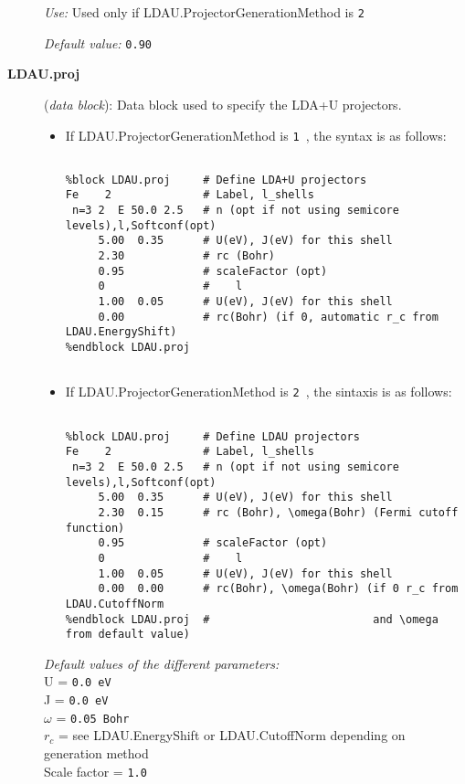 \begin{description}
\textit{Use:} Used only if LDAU.ProjectorGenerationMethod is \texttt{2 }

\textit{Default value:} \texttt{0.90 }

\item[\textbf{LDAU.proj}] (\textit{data block}):
Data block used to specify the LDA+U projectors.

\begin{itemize}
\item If LDAU.ProjectorGenerationMethod is \texttt{1 }, the
syntax is as follows:
\begin{verbatim}

%block LDAU.proj     # Define LDA+U projectors
Fe    2              # Label, l_shells
 n=3 2  E 50.0 2.5   # n (opt if not using semicore levels),l,Softconf(opt)
     5.00  0.35      # U(eV), J(eV) for this shell
     2.30            # rc (Bohr)
     0.95            # scaleFactor (opt)
     0               #    l
     1.00  0.05      # U(eV), J(eV) for this shell
     0.00            # rc(Bohr) (if 0, automatic r_c from LDAU.EnergyShift)
%endblock LDAU.proj


\end{verbatim}

\item If LDAU.ProjectorGenerationMethod is \texttt{2 }, the
sintaxis is as follows:
\begin{verbatim}

%block LDAU.proj     # Define LDAU projectors
Fe    2              # Label, l_shells
 n=3 2  E 50.0 2.5   # n (opt if not using semicore levels),l,Softconf(opt)
     5.00  0.35      # U(eV), J(eV) for this shell
     2.30  0.15      # rc (Bohr), \omega(Bohr) (Fermi cutoff function)
     0.95            # scaleFactor (opt)
     0               #    l
     1.00  0.05      # U(eV), J(eV) for this shell
     0.00  0.00      # rc(Bohr), \omega(Bohr) (if 0 r_c from LDAU.CutoffNorm
%endblock LDAU.proj  #                         and \omega from default value)

\end{verbatim}
\end{itemize}
\textit{Default values of the different parameters:} \\
U = \texttt{0.0 eV} \\
J = \texttt{0.0 eV} \\
$\omega$ = \texttt{0.05 Bohr} \\
$r_c$ = see LDAU.EnergyShift or LDAU.CutoffNorm depending on generation method\\
Scale factor = \texttt{1.0 }


\end{description}
